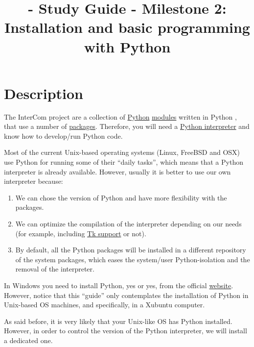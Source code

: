 
\title{\TM{} - Study Guide - Milestone 2: Installation and basic programming with Python}

\maketitle

\section{Description}

The InterCom project \cite{intercom} are a collection of
\href{https://www.python.org/}{Python}
\href{https://docs.python.org/3/tutorial/modules.html#modules}{modules}
written in Python \cite{python}, that use a number of
\href{https://docs.python.org/3/tutorial/modules.html#packages}{packages}. Therefore,
you will need a
\href{https://docs.python.org/3/tutorial/interpreter.html}{Python
  interpreter} and know how to develop/run Python code.

Most of the current Unix-based operating systems (Linux, FreeBSD and
OSX) use Python for running some of their ``daily tasks'', which means
that a Python interpreter is already available. However, usually it is
better to use our own interpreter because:

\begin{enumerate}

\item We can chose the version of Python and have more flexibility
  with the packages.

\item We can optimize the compilation of the interpreter depending on
  our needs (for example, including
  \href{https://wiki.python.org/moin/TkInter}{Tk support} or not).

\item By default, all the Python packages will be installed in a
  different repository of the system packages, which eases the
  system/user Python-isolation and the removal of the interpreter.

\end{enumerate}

In Windows you need to install Python, yes or yes, from the official
\href{https://www.python.org/downloads/}{website}. However, notice
that this ``guide'' only contemplates the installation of Python in
Unix-based OS machines, and specifically, in a Xubuntu computer.

As said before, it is very likely that your Unix-like OS has Python
installed. However, in order to control the version of the Python
interpreter, we will install a dedicated one.

